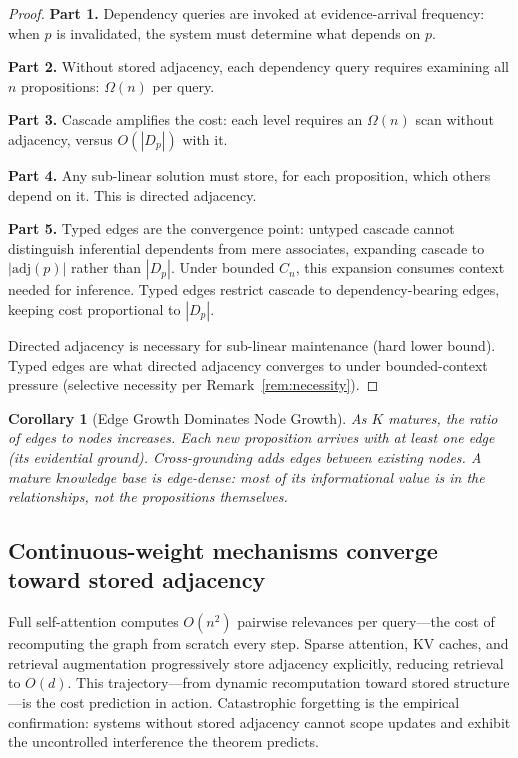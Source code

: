 \documentclass[11pt]{article}
\newtheorem{corollary}[theorem]{Corollary}
\theoremstyle{definition}
\theoremstyle{remark}
\begin{document}
\begin{proof}
\textbf{Part 1.} Dependency queries are invoked at evidence-arrival
frequency: when $p$ is invalidated, the system must determine what
depends on $p$.

\textbf{Part 2.} Without stored adjacency, each dependency query
requires examining all $n$ propositions: $\Omega(n)$ per query.

\textbf{Part 3.} Cascade amplifies the cost: each level requires
an $\Omega(n)$ scan without adjacency, versus $O(|D_p|)$ with it.

\textbf{Part 4.} Any sub-linear solution must store, for each
proposition, which others depend on it. This is directed adjacency.

\textbf{Part 5.} Typed edges are the convergence point: untyped
cascade cannot distinguish inferential dependents from mere
associates, expanding cascade to $|\mathrm{adj}(p)|$ rather than
$|D_p|$. Under bounded $C_n$, this expansion consumes context needed
for inference. Typed edges restrict cascade to dependency-bearing
edges, keeping cost proportional to $|D_p|$.

Directed adjacency is necessary for sub-linear maintenance (hard lower
bound). Typed edges are what directed adjacency converges to under
bounded-context pressure (selective necessity per
Remark~\ref{rem:necessity}).
\end{proof}

\begin{corollary}[Edge Growth Dominates Node Growth]
\label{cor:edge-growth}
As $K$ matures, the ratio of edges to nodes increases. Each new
proposition arrives with at least one edge (its evidential ground).
Cross-grounding adds edges between existing nodes. A mature knowledge
base is edge-dense: most of its informational value is in the
relationships, not the propositions themselves.
\end{corollary}

\subsection{Continuous-weight mechanisms converge toward stored adjacency}

Full self-attention computes $O(n^2)$ pairwise relevances per query---the
cost of recomputing the graph from scratch every step. Sparse attention,
KV caches, and retrieval augmentation progressively store adjacency
explicitly, reducing retrieval to $O(d)$. This trajectory---from dynamic
recomputation toward stored structure---is the cost prediction in action.
Catastrophic forgetting \cite{McCloskey1989,Kirkpatrick2017} is the
empirical confirmation: systems without stored adjacency cannot scope
updates and exhibit the uncontrolled interference the theorem predicts.
\end{document}
